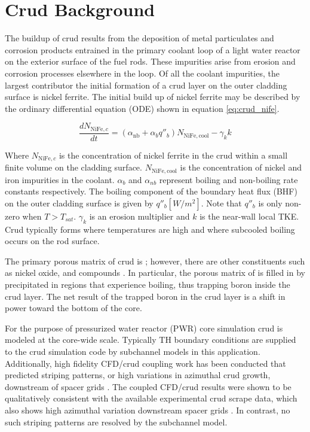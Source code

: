 \section{Crud Background}

The buildup of crud results from the deposition of metal particulates and corrosion products entrained in the primary coolant loop of a light water reactor on the exterior surface of the fuel rods.  These impurities arise from erosion and corrosion processes elsewhere in the loop.  Of all the coolant impurities, the largest contributor the initial formation of a crud layer on the outer cladding surface is nickel ferrite.  The initial build up of nickel ferrite may be described by the ordinary differential equation (ODE) shown in equation \ref{eq:crud_nife}.

\begin{equation}
\frac{d N_{\mathrm{NiFe},c}}{dt} = (\alpha_{\mathrm{nb}} + \alpha_{b}q''_{b} )N_{\mathrm{NiFe}, \mathrm{cool}} - \gamma_k k
\label{eq:crud_nife}
\end{equation}

Where $N_{\mathrm{NiFe},c}$ is the concentration of nickel ferrite in the crud within a small finite volume on the cladding surface.  $N_{\mathrm{NiFe}, \mathrm{cool}}$ is the concentration of nickel and iron impurities in the coolant.  $\alpha_b$ and $\alpha_{nb}$ represent boiling and non-boiling rate constants respectively.  The boiling component of the boundary heat flux (BHF) on the outer cladding surface is given by $q''_b [W/m^2]$. Note that  $q''_b$ is only non-zero when $T>T_{sat}$. $\gamma_k$ is an erosion multiplier and $k$ is the near-wall local TKE.  Crud typically forms where temperatures are high and where subcooled boiling occurs on the rod surface.

The primary porous matrix of crud is ; however, there are other constituents such as nickel oxide,  and  compounds \cite{Henshaw2006TheCO} \cite{mongoose17}. In particular, the porous matrix of  is filled in by precipitated  in regions that experience boiling, thus trapping boron inside the crud layer.  The net result of the trapped boron in the crud layer is a shift in power toward the bottom of the core.

For the purpose of pressurized water reactor (PWR) core simulation crud is modeled at the core-wide scale.  Typically TH boundary conditions are supplied to the crud simulation code by subchannel models in this application.  Additionally, high fidelity CFD/crud coupling work has been conducted that predicted striping patterns, or high variations in azimuthal crud growth, downstream of spacer grids \cite{slattery16}.  The coupled CFD/crud results were shown to be qualitatively consistent with the available experimental crud scrape data, which also shows high azimuthal variation downstream spacer grids \cite{kendrick13}. In contrast, no such striping patterns are resolved by the subchannel model.

